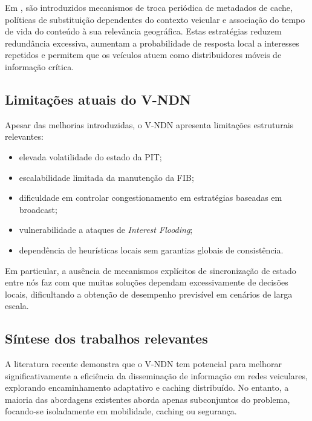 Em \cite{amadeo_caching_2020}, são introduzidos mecanismos de troca periódica de metadados de cache, políticas de substituição dependentes do contexto veicular e associação do tempo de vida do conteúdo à sua relevância geográfica. Estas estratégias reduzem redundância excessiva, aumentam a probabilidade de resposta local a interesses repetidos e permitem que os veículos atuem como distribuidores móveis de informação crítica.

\subsection{Limitações atuais do V-NDN}

Apesar das melhorias introduzidas, o \gls{V-NDN} apresenta limitações estruturais relevantes:

\begin{itemize}
    \item elevada volatilidade do estado da \gls{PIT};
    \item escalabilidade limitada da manutenção da \gls{FIB};
    \item dificuldade em controlar congestionamento em estratégias baseadas em broadcast;
    \item vulnerabilidade a ataques de \textit{Interest Flooding};
    \item dependência de heurísticas locais sem garantias globais de consistência.
\end{itemize}

Em particular, a ausência de mecanismos explícitos de sincronização de estado entre nós faz com que muitas soluções dependam excessivamente de decisões locais, dificultando a obtenção de desempenho previsível em cenários de larga escala.

\subsection{Síntese dos trabalhos relevantes}

A literatura recente demonstra que o \gls{V-NDN} tem potencial para melhorar significativamente a eficiência da disseminação de informação em redes veiculares, explorando encaminhamento adaptativo e caching distribuído. No entanto, a maioria das abordagens existentes aborda apenas subconjuntos do problema, focando-se isoladamente em mobilidade, caching ou segurança.

